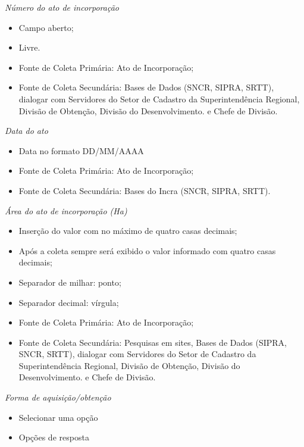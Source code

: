 \documentclass[
  letterpaper,
]{report}
\providecommand{\tightlist}{%
  \setlength{\itemsep}{0pt}\setlength{\parskip}{0pt}}\usepackage{longtable,booktabs,array}
\begin{document}
\emph{Número do ato de incorporação}

\begin{itemize}
\tightlist
\item
  Campo aberto;
\item
  Livre.
\item
  Fonte de Coleta Primária: Ato de Incorporação;
\item
  Fonte de Coleta Secundária: Bases de Dados (SNCR, SIPRA, SRTT),
  dialogar com Servidores do Setor de Cadastro da Superintendência
  Regional, Divisão de Obtenção, Divisão do Desenvolvimento. e Chefe de
  Divisão.
\end{itemize}

\emph{Data do ato}

\begin{itemize}
\tightlist
\item
  Data no formato DD/MM/AAAA
\item
  Fonte de Coleta Primária: Ato de Incorporação;
\item
  Fonte de Coleta Secundária: Bases do Incra (SNCR, SIPRA, SRTT).
\end{itemize}

\emph{Área do ato de incorporação (Ha)}

\begin{itemize}
\tightlist
\item
  Inserção do valor com no máximo de quatro casas decimais;
\item
  Após a coleta sempre será exibido o valor informado com quatro casas
  decimais;
\item
  Separador de milhar: ponto;
\item
  Separador decimal: vírgula;
\item
  Fonte de Coleta Primária: Ato de Incorporação;
\item
  Fonte de Coleta Secundária: Pesquisas em sites, Bases de Dados (SIPRA,
  SNCR, SRTT), dialogar com Servidores do Setor de Cadastro da
  Superintendência Regional, Divisão de Obtenção, Divisão do
  Desenvolvimento. e Chefe de Divisão.
\end{itemize}

\emph{Forma de aquisição/obtenção}

\begin{itemize}
\tightlist
\item
  Selecionar uma opção
\item
  Opções de resposta
\end{itemize}
\end{document}
